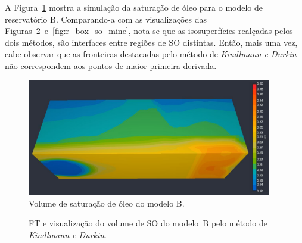 	A Figura~\ref{fig:r_box_so_slice} mostra a simulação da saturação de óleo para o modelo de reservatório B. Comparando-a com as visualizações das Figuras~\ref{fig:r_box_so_kd}~e~\ref{fig:r_box_so_mine}, nota-se que as isosuperfícies realçadas pelos dois métodos, são interfaces entre regiões de SO distintas. Então, mais uma vez, cabe observar que as fronteiras destacadas pelo método de \textit{Kindlmann e Durkin} não correspondem aos pontos de maior primeira derivada.

\begin{figure}[h]
	\centering
	\includegraphics[width=0.95\textwidth]{images/r_box_so_slice}
	\caption{Volume de saturação de óleo do modelo B.}
	\label{fig:r_box_so_slice}
\end{figure}

\begin{figure}[h]
	\centering
	\caption{FT e visualização do volume de SO do modelo~B pelo método de \textit{Kindlmann e Durkin}.}
	\label{fig:r_box_so_kd}
\end{figure}

